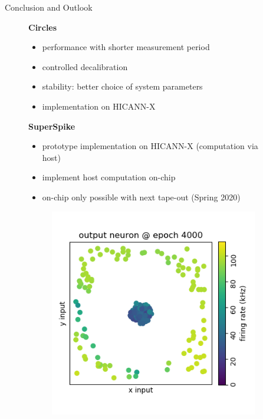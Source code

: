 \documentclass[12pt, aspectratio=169]{beamer}
\begin{document}
\begin{frame}{Conclusion and Outlook}
\begin{figure}[!htb]
        \textbf{Circles}
            \begin{itemize}
                \item performance with shorter measurement period
                \item controlled decalibration
                \item stability: better choice of system parameters
                \item implementation on HICANN-X
            \end{itemize}
        \textbf{SuperSpike}
        \begin{itemize}
            \item prototype implementation on HICANN-X (computation via host)
            \item implement host computation on-chip
            \item on-chip only possible with next tape-out (Spring 2020)
        \end{itemize}
  	\endminipage\hfill
  	\centering
        \begin{figure}
            \includegraphics[scale=0.3]{output_neuron_4000.png}
            \label{fig:my_label}
        \end{figure}
    \endminipage\hfill
\end{figure}
\end{frame}
\end{document}
